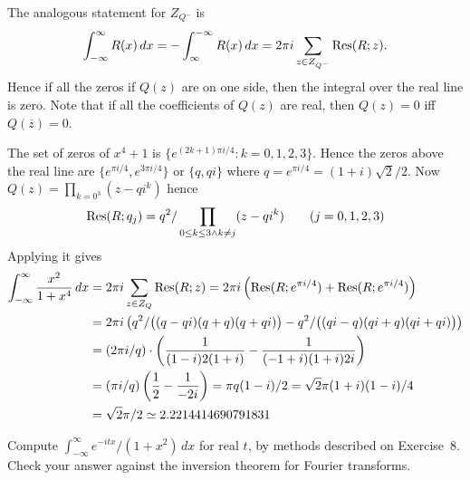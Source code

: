 \begin{enumerate}
The analogous statement for \(Z_{Q^-}\) is
\begin{equation*}
\int_{-\infty}^{\infty} R(x)\,dx 
= -\int_{\infty}^{-\infty} R(x)\,dx 
= 2\pi i \sum_{z\in Z_{Q^-}} \mathop{\rm Res}\nolimits(R;z).
\end{equation*}
Hence if all the zeros if \(Q(z)\) are on one side, then the integral
over the real line is zero. 
Note that if all the coefficients of \(Q(z)\) are real,
then \(Q(z)=0\) iff \(Q(\overline{z})=0\).

The set of zeros of \(x^4+1\) is \(\{e^{(2k+1)\pi i/4}: k=0,1,2,3\}\).
Hence the zeros above the real line are \(\{e^{\pi i/4}, e^{3\pi i/4}\}\)
or \(\{q,qi\}\) where \(q=e^{\pi i/4}=(1+i)\sqrt{2}/2\).
Now \(Q(z)=\prod_{k=0^3} (z-qi^k)\) hence
\begin{equation*}
\mathop{\rm Res}\nolimits(R;q_j) = q^2/ \prod_{0\leq k\leq3 \wedge k\neq j} (z-qi^k) \qquad (j=0,1,2,3)
\end{equation*}
Applying it gives
\begin{align*}
 \int_{-\infty}^\infty \frac{x^2}{1+x^4}\,dx
 &= 2\pi i \sum_{z\in Z_Q} \mathop{\rm Res}\nolimits(R;z)
  = 2\pi i \left( \mathop{\rm Res}\nolimits(R; e^{\pi i/4}) + \mathop{\rm Res}\nolimits(R; e^{\pi i/4})\right) \\
 &= 2\pi i \left( q^2/\bigl((q-qi)(q+q)(q+qi)\bigr) 
                 -q^2/\bigl((qi-q)(qi+q)(qi+qi)\bigr)\right) \\
 &= (2\pi i/q) \cdot
    \left(\frac{1}{(1-i)2(1+i)} - \frac{1}{(-1+i)(1+i)2i}\right) \\
 &= (\pi i/q)  \left(\frac{1}{2}  - \frac{1}{-2i}\right) 
  = \pi q (1-i)/2 
  = \sqrt{2}\pi(1+i)(1-i)/4 \\
 &= \sqrt{2}\pi/2 \simeq 2.2214414690791831
\end{align*}


\begin{excopy}
Compute \(\int_{-\infty}^\infty e^{-itx}/(1+x^2)\,dx\) for real $t$,
by methods described on Exercise~8.
Check your answer against the inversion theorem for Fourier transforms.
\end{excopy}


\end{enumerate}
